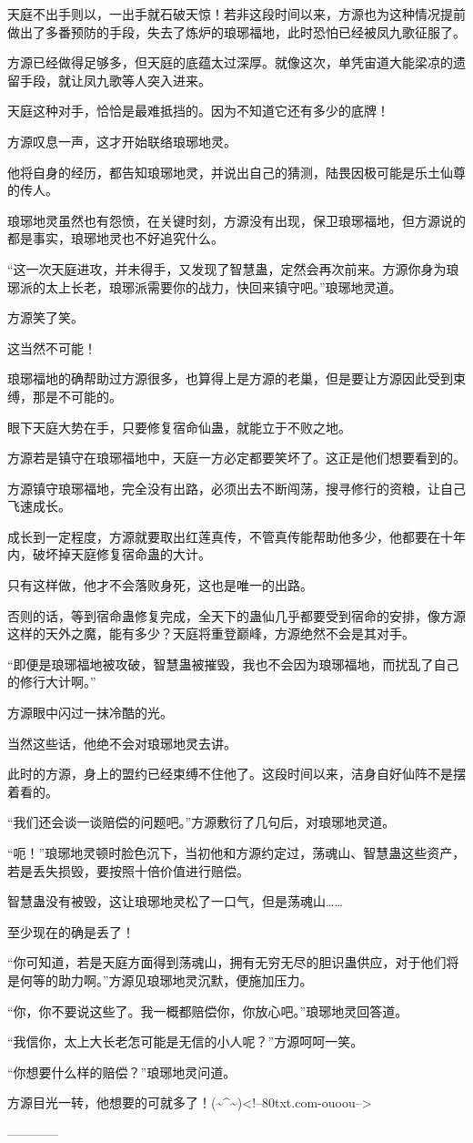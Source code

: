 \begin{this_body}
天庭不出手则以，一出手就石破天惊！若非这段时间以来，方源也为这种情况提前做出了多番预防的手段，失去了炼炉的琅琊福地，此时恐怕已经被凤九歌征服了。

方源已经做得足够多，但天庭的底蕴太过深厚。就像这次，单凭宙道大能梁凉的遗留手段，就让凤九歌等人突入进来。

天庭这种对手，恰恰是最难抵挡的。因为不知道它还有多少的底牌！

方源叹息一声，这才开始联络琅琊地灵。

他将自身的经历，都告知琅琊地灵，并说出自己的猜测，陆畏因极可能是乐土仙尊的传人。

琅琊地灵虽然也有怨愤，在关键时刻，方源没有出现，保卫琅琊福地，但方源说的都是事实，琅琊地灵也不好追究什么。

“这一次天庭进攻，并未得手，又发现了智慧蛊，定然会再次前来。方源你身为琅琊派的太上长老，琅琊派需要你的战力，快回来镇守吧。”琅琊地灵道。

方源笑了笑。

这当然不可能！

琅琊福地的确帮助过方源很多，也算得上是方源的老巢，但是要让方源因此受到束缚，那是不可能的。

眼下天庭大势在手，只要修复宿命仙蛊，就能立于不败之地。

方源若是镇守在琅琊福地中，天庭一方必定都要笑坏了。这正是他们想要看到的。

方源镇守琅琊福地，完全没有出路，必须出去不断闯荡，搜寻修行的资粮，让自己飞速成长。

成长到一定程度，方源就要取出红莲真传，不管真传能帮助他多少，他都要在十年内，破坏掉天庭修复宿命蛊的大计。

只有这样做，他才不会落败身死，这也是唯一的出路。

否则的话，等到宿命蛊修复完成，全天下的蛊仙几乎都要受到宿命的安排，像方源这样的天外之魔，能有多少？天庭将重登巅峰，方源绝然不会是其对手。

“即便是琅琊福地被攻破，智慧蛊被摧毁，我也不会因为琅琊福地，而扰乱了自己的修行大计啊。”

方源眼中闪过一抹冷酷的光。

当然这些话，他绝不会对琅琊地灵去讲。

此时的方源，身上的盟约已经束缚不住他了。这段时间以来，洁身自好仙阵不是摆着看的。

“我们还会谈一谈赔偿的问题吧。”方源敷衍了几句后，对琅琊地灵道。

“呃！”琅琊地灵顿时脸色沉下，当初他和方源约定过，荡魂山、智慧蛊这些资产，若是丢失损毁，要按照十倍价值进行赔偿。

智慧蛊没有被毁，这让琅琊地灵松了一口气，但是荡魂山……

至少现在的确是丢了！

“你可知道，若是天庭方面得到荡魂山，拥有无穷无尽的胆识蛊供应，对于他们将是何等的助力啊。”方源见琅琊地灵沉默，便施加压力。

“你，你不要说这些了。我一概都赔偿你，你放心吧。”琅琊地灵回答道。

“我信你，太上大长老怎可能是无信的小人呢？”方源呵呵一笑。

“你想要什么样的赔偿？”琅琊地灵问道。

方源目光一转，他想要的可就多了！(\~{}\^{}\~{})<!--80txt.com-ouoou-->

------------

\end{this_body}

